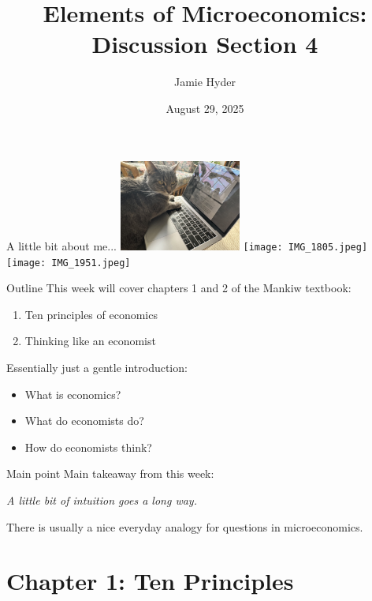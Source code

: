 \documentclass[compress]{beamer}
\title{Elements of Microeconomics: \\
       Discussion Section 4}
\author{Jamie Hyder}
\date{August 29, 2025}
\begin{document}
\begin{frame}
  \titlepage
\end{frame}

\begin{frame}{A little bit about me...}
\centering
  \includegraphics[width=0.3\textwidth, angle = 180]{IMG_0647.jpeg}%
  \hfill
  \texttt{[image: IMG\_1805.jpeg]}
\hfill
  \texttt{[image: IMG\_1951.jpeg]}
\end{frame}

\begin{frame}{Outline}
    This week will cover chapters 1 and 2 of the Mankiw textbook:
    \begin{enumerate}
        \item Ten principles of economics
        \item Thinking like an economist
    \end{enumerate}

    \medskip

    Essentially just a gentle introduction: 
    \begin{itemize}
        \item What is economics?
        \item What do economists do?
        \item How do economists think?
    \end{itemize}
\end{frame}


\begin{frame}{Main point}
    \centering
    Main takeaway from this week:

    \vspace{12pt}

    \Large \textit{A little bit of intuition goes a long way.}

    \bigskip

    \normalsize There is usually a nice everyday analogy for questions in microeconomics. 
\end{frame}


\section{Chapter 1: Ten Principles}
\end{document}
